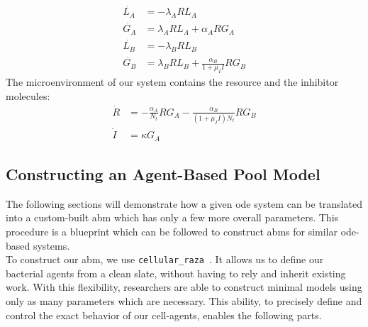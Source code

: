 \documentclass[10pt,twocolumn,5p]{elsarticle}
\numberwithin{equation}{section}
\begin{document}
%
\begin{align}
    \dot{L_A} &= -\lambda_A R L_A\\
    \dot{G_A} &= \lambda_A R L_A + \alpha_A R G_A\\
    \dot{L_B} &= -\lambda_B R L_B\\
    \dot{G_B} &= \lambda_B R L_B + \frac{\alpha_B}{1 + \mu_I I} R G_B
    \label{eq:spatial_limit_F}
\end{align}
%
The microenvironment of our system contains the resource and the inhibitor molecules:
\begin{align}
    \dot{R} &= -\frac{\alpha_A}{N_t} R G_A-\frac{\alpha_B}{(1 + \mu_I I) N_t} R G_B \\
    \dot{I} &= \kappa G_A
    \label{eq:spatial_limit_H}
\end{align}

\subsection{Constructing an Agent-Based Pool Model}
The following sections will demonstrate how a given \ac{ode} system can be translated into a
custom-built \ac{abm} which has only a few more overall parameters.
This procedure is a blueprint which can be followed to construct \acp{abm} for similar
\ac{ode}-based systems.\\
To construct our \ac{abm}, we use \texttt{cellular\_raza}~\cite{Pleyer2025}.
It allows us to define our bacterial agents from a clean slate, without having to rely and inherit
existing work.
With this flexibility, researchers are able to construct minimal models using only as many parameters which are necessary.
This ability, to precisely define and control the exact behavior of our cell-agents, enables the following parts.
\end{document}

